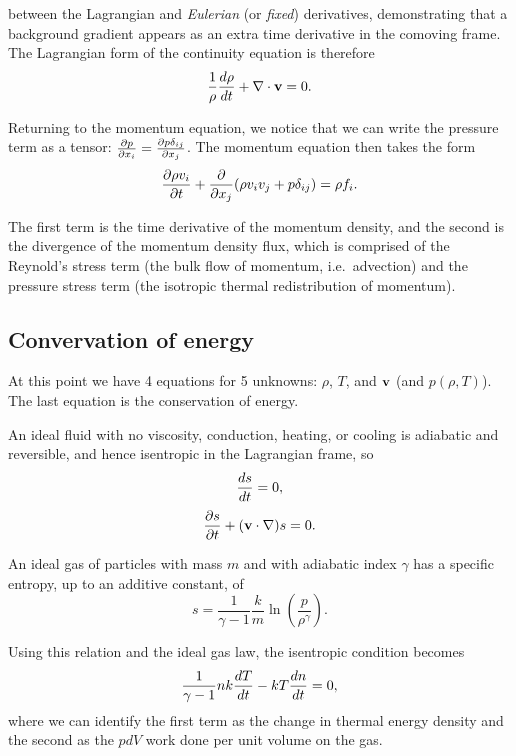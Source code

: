 \documentclass[../ay202_class_notes.tex]{subfiles}
\begin{document}
\noindent between the Lagrangian and \emph{Eulerian} (or \emph{fixed}) derivatives, demonstrating that a background gradient appears as an extra time derivative in the comoving frame.  The Lagrangian form of the continuity equation is therefore
\begin{equation}
\frac{1}{\rho} \frac{d \rho}{d t} + \nabla \cdot \mathbf{v} = 0.
\end{equation}

Returning to the momentum equation, we notice that we can write the pressure term as a tensor: $\frac{\partial p}{\partial x_i} = \frac{\partial p \delta_{ij}}{\partial x_j}$.  The momentum equation then takes the form
\begin{equation}
\frac{\partial \rho v_i}{\partial t} + \frac{\partial }{\partial x_j}(\rho v_i v_j +p \delta_{ij}) = \rho f_i.
\end{equation}

\noindent The first term is the time derivative of the momentum density, and the second is the divergence of the  momentum density flux, which is comprised of the Reynold's stress term (the bulk flow of momentum, i.e.~advection) and the pressure stress term (the isotropic thermal redistribution of momentum).

\subsection{Convervation of energy}
At this point we have 4 equations for 5 unknowns: $\rho$, $T$, and $\mathbf{v}$ (and $p(\rho, T)$).  The last equation is the conservation of energy.

An ideal fluid with no viscosity, conduction, heating, or cooling is adiabatic and reversible, and hence isentropic in the Lagrangian frame, so 
\begin{equation}
\frac{d s}{d t} = 0,
\end{equation}
\begin{equation}
\frac{\partial s}{\partial t} + (\mathbf{v} \cdot \nabla) s = 0.
\end{equation}

\noindent An ideal gas of particles with mass $m$ and with adiabatic index $\gamma$ has a specific entropy, up to an additive constant, of
\begin{equation}
s = \frac{1}{\gamma - 1} \frac{k}{m} \ln \left(\frac{p}{\rho^\gamma}\right).
\end{equation}

\noindent Using this relation and the ideal gas law, the isentropic condition becomes
\begin{equation}
\frac{1}{\gamma - 1} n k \frac{d T}{d t} - kT \frac{d n}{d t} = 0,
\end{equation}
where we can identify the first term as the change in thermal energy density and the second as the $p dV$ work done per unit volume on the gas.
\end{document}
